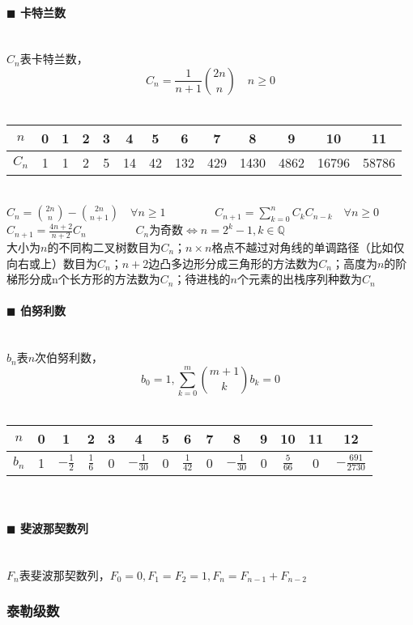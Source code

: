 \paragraph{$\blacksquare$ 卡特兰数}
\noindent \\
$C_n$表卡特兰数，$$C_n=\frac{1}{n+1}\binom{2n}{n} \quad n\geq 0$$\\
\begin{tabular}{|c|c|c|c|c|c|c|c|c|c|c|c|c|}
\hline $n$&0&1&2&3&4&5&6&7&8&9&10&11\\
\hline $C_n$&1&1&2&5&14&42&132&429&1430&4862&16796&58786\\
\hline
\end{tabular}\\
$C_n=\binom{2n}{n}-\binom{2n}{n+1} \quad \forall n\geq 1$~~~~~~~~
${\displaystyle C_{n+1}=\sum _{k=0}^{n} C_k C_{n-k} \quad \forall n\geq 0}$\\
$C_{n+1}=\frac{4n+2}{n+2} C_n$~~~~~~~~
$C_n$为奇数$\Leftrightarrow n=2^k-1, k\in \mathbb{Q}$\\
大小为$n$的不同构二叉树数目为$C_n$；$n\times n$格点不越过对角线的单调路径（比如仅向右或上）数目为$C_n$；$n+2$边凸多边形分成三角形的方法数为$C_n$；高度为$n$的阶梯形分成n个长方形的方法数为$C_n$；待进栈的$n$个元素的出栈序列种数为$C_n$
\paragraph{$\blacksquare$ 伯努利数}
\noindent \\
$b_n$表$n$次伯努利数，$${\displaystyle b_0=1, \sum _{k=0}^{m} \binom{m+1}{k} b_k=0}$$\\
\begin{tabular}{|c|c|c|c|c|c|c|c|c|c|c|c|c|c|}
\hline $n$&0&1&2&3&4&5&6&7&8&9&10&11&12\\
\hline $b_n$&1&$-\frac{1}{2}$&$\frac{1}{6}$&0&$-\frac{1}{30}$&0&$\frac{1}{42}$&0&$-\frac{1}{30}$&0&$\frac{5}{66}$&0&$-\frac{691}{2730}$\\
\hline
\end{tabular}\\
\paragraph{$\blacksquare$ 斐波那契数列}
\noindent \\
$F_n$表斐波那契数列，$F_0=0, F_1=F_2=1, F_n=F_{n-1}+F_{n-2}$\\

\subsubsection{泰勒级数}


